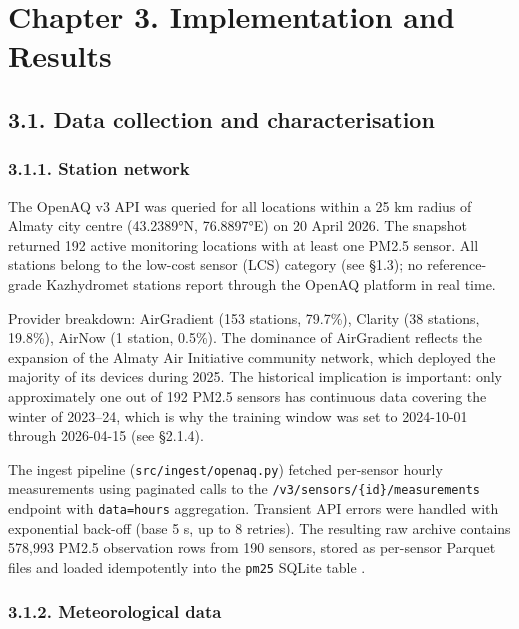 \section{Chapter 3. Implementation and Results}\label{chapter-3.-implementation-and-results}

\subsection{3.1. Data collection and characterisation}\label{data-collection-and-characterisation}

\subsubsection{3.1.1. Station network}\label{station-network}

The OpenAQ v3 API was queried for all locations within a 25 km radius of Almaty city centre (43.2389°N, 76.8897°E) on 20 April 2026. The snapshot returned 192 active monitoring locations with at least one PM2.5 sensor. All stations belong to the low-cost sensor (LCS) category (see §1.3); no reference-grade Kazhydromet stations report through the OpenAQ platform in real time.

Provider breakdown: AirGradient (153 stations, 79.7\%), Clarity (38 stations, 19.8\%), AirNow (1 station, 0.5\%). The dominance of AirGradient reflects the expansion of the Almaty Air Initiative community network, which deployed the majority of its devices during 2025. The historical implication is important: only approximately one out of 192 PM2.5 sensors has continuous data covering the winter of 2023--24, which is why the training window was set to 2024-10-01 through 2026-04-15 (see §2.1.4).

The ingest pipeline (\texttt{src/ingest/openaq.py}) fetched per-sensor hourly measurements using paginated calls to the \texttt{/v3/sensors/\{id\}/measurements} endpoint with \texttt{data=hours} aggregation. Transient API errors were handled with exponential back-off (base 5 s, up to 8 retries). The resulting raw archive contains 578,993 PM2.5 observation rows from 190 sensors, stored as per-sensor Parquet files and loaded idempotently into the \texttt{pm25} SQLite table \cite{openaq_platform}.

\subsubsection{3.1.2. Meteorological data}\label{meteorological-data}

